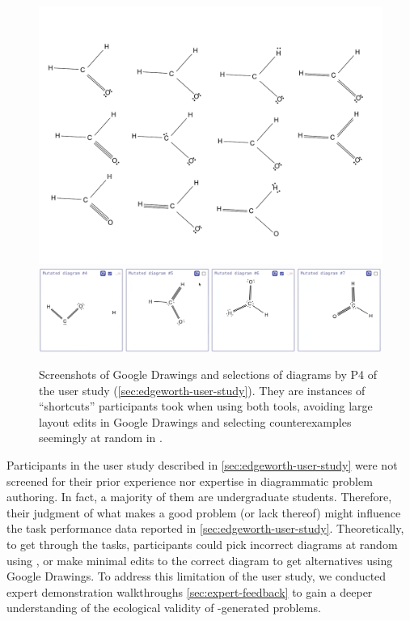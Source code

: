 \begin{figure}[t]
    \centering
    \includegraphics[width=\linewidth]{assets/edgeworth-eval/p4-drawings.pdf}
    \includegraphics[width=\linewidth]{assets/edgeworth-eval/p4-edgeworth.png}
    \caption{Screenshots of Google Drawings  and \Edgeworth selections  of diagrams by P4 of the user study (\cref{sec:edgeworth-user-study}). They are instances of ``shortcuts'' participants took when using both tools, avoiding large layout edits  in Google Drawings and selecting counterexamples seemingly at random in \Edgeworth {}. }
    \label{fig:edgeworth-user-study-shortcuts}
\end{figure}


Participants in the user study described in \cref{sec:edgeworth-user-study} were not screened for their prior experience nor expertise in diagrammatic problem authoring. In fact, a majority of them are undergraduate students. Therefore, their judgment of what makes a good problem (or lack thereof) might influence the task performance data reported in \cref{sec:edgeworth-user-study}. Theoretically, to get through the tasks, participants could pick incorrect diagrams at random using \Edgeworth, or make minimal edits to the correct diagram to get alternatives using Google Drawings. To address this limitation of the user study, we conducted  expert demonstration walkthroughs \cref{sec:expert-feedback} to gain a deeper understanding of the ecological validity of \Edgeworth-generated problems.

